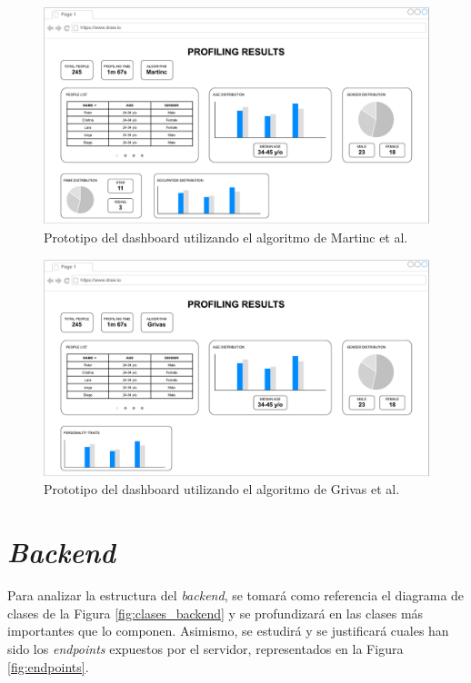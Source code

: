 \bigskip
\begin{figure}[H]
	\centering
	\includegraphics[width=\textwidth]{diagramas/dashboard-martinc.pdf}
	\caption{Prototipo del dashboard utilizando el algoritmo de Martinc et al. \cite{martinc2019hot}}
	\label{fig:prototipo_dashboard_martinc}
\end{figure}

\bigskip
\begin{figure}[H]
	\centering
	\includegraphics[width=\textwidth]{diagramas/dashboard-grivas.pdf}
	\caption{Prototipo del dashboard utilizando el algoritmo de Grivas et al. \cite{grivas2015author}}
	\label{fig:prototipo_dashboard_grivas}
\end{figure}

\section{\textit{Backend}}

Para analizar la estructura del \textit{backend}, se tomará como referencia el diagrama de clases de la Figura \ref{fig:clases_backend} y se profundizará
en las clases más importantes que lo componen. Asimismo, se estudirá y se justificará cuales han sido los \textit{endpoints} expuestos por el servidor,
representados en la Figura \ref{fig:endpoints}.

